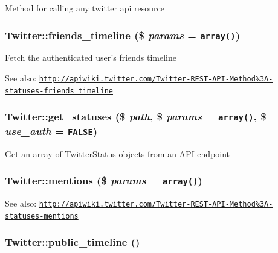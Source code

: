 Method for calling any twitter api resource \hypertarget{classTwitter_b71b8679389a26cbba74c0b89c896dea}{
\subsubsection[{friends\_\-timeline}]{\setlength{\rightskip}{0pt plus 5cm}Twitter::friends\_\-timeline (\$ {\em params} = {\tt array()})}}
\label{classTwitter_b71b8679389a26cbba74c0b89c896dea}


Fetch the authenticated user's friends timeline

\begin{Desc}
\item[See also:]\href{http://apiwiki.twitter.com/Twitter-REST-API-Method%3A-statuses-friends_timeline}{\tt http://apiwiki.twitter.com/Twitter-REST-API-Method\%3A-statuses-friends\_\-timeline} \end{Desc}
\hypertarget{classTwitter_37f6425df087eb6bf1477fd0921c8d28}{
\subsubsection[{get\_\-statuses}]{\setlength{\rightskip}{0pt plus 5cm}Twitter::get\_\-statuses (\$ {\em path}, \/  \$ {\em params} = {\tt array()}, \/  \$ {\em use\_\-auth} = {\tt FALSE})}}
\label{classTwitter_37f6425df087eb6bf1477fd0921c8d28}


Get an array of \hyperlink{classTwitterStatus}{TwitterStatus} objects from an API endpoint \hypertarget{classTwitter_f8edee3b3dd9cd0f689b10e35562351f}{
\subsubsection[{mentions}]{\setlength{\rightskip}{0pt plus 5cm}Twitter::mentions (\$ {\em params} = {\tt array()})}}
\label{classTwitter_f8edee3b3dd9cd0f689b10e35562351f}


\begin{Desc}
\item[See also:]\href{http://apiwiki.twitter.com/Twitter-REST-API-Method%3A-statuses-mentions}{\tt http://apiwiki.twitter.com/Twitter-REST-API-Method\%3A-statuses-mentions} \end{Desc}
\hypertarget{classTwitter_d510f44c049b383baef399f40fe46af5}{
\subsubsection[{public\_\-timeline}]{\setlength{\rightskip}{0pt plus 5cm}Twitter::public\_\-timeline ()}}
\label{classTwitter_d510f44c049b383baef399f40fe46af5}


